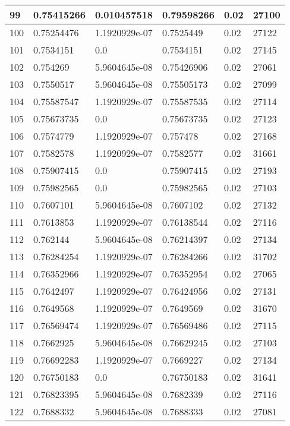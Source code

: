 \begin{longtable}{|l|l|l|l|l|l|}
99 & 0.75415266 & 0.010457518 & 0.79598266 & 0.02 & 27100 \\ \hline 
100 & 0.75254476 & 1.1920929e-07 & 0.7525449 & 0.02 & 27122 \\ \hline 
101 & 0.7534151 & 0.0 & 0.7534151 & 0.02 & 27145 \\ \hline 
102 & 0.754269 & 5.9604645e-08 & 0.75426906 & 0.02 & 27061 \\ \hline 
103 & 0.7550517 & 5.9604645e-08 & 0.75505173 & 0.02 & 27099 \\ \hline 
104 & 0.75587547 & 1.1920929e-07 & 0.75587535 & 0.02 & 27114 \\ \hline 
105 & 0.75673735 & 0.0 & 0.75673735 & 0.02 & 27123 \\ \hline 
106 & 0.7574779 & 1.1920929e-07 & 0.757478 & 0.02 & 27168 \\ \hline 
107 & 0.7582578 & 1.1920929e-07 & 0.7582577 & 0.02 & 31661 \\ \hline 
108 & 0.75907415 & 0.0 & 0.75907415 & 0.02 & 27193 \\ \hline 
109 & 0.75982565 & 0.0 & 0.75982565 & 0.02 & 27103 \\ \hline 
110 & 0.7607101 & 5.9604645e-08 & 0.7607102 & 0.02 & 27132 \\ \hline 
111 & 0.7613853 & 1.1920929e-07 & 0.76138544 & 0.02 & 27116 \\ \hline 
112 & 0.762144 & 5.9604645e-08 & 0.76214397 & 0.02 & 27134 \\ \hline 
113 & 0.76284254 & 1.1920929e-07 & 0.76284266 & 0.02 & 31702 \\ \hline 
114 & 0.76352966 & 1.1920929e-07 & 0.76352954 & 0.02 & 27065 \\ \hline 
115 & 0.7642497 & 1.1920929e-07 & 0.76424956 & 0.02 & 27131 \\ \hline 
116 & 0.7649568 & 1.1920929e-07 & 0.7649569 & 0.02 & 31670 \\ \hline 
117 & 0.76569474 & 1.1920929e-07 & 0.76569486 & 0.02 & 27115 \\ \hline 
118 & 0.7662925 & 5.9604645e-08 & 0.76629245 & 0.02 & 27103 \\ \hline 
119 & 0.76692283 & 1.1920929e-07 & 0.7669227 & 0.02 & 27134 \\ \hline 
120 & 0.76750183 & 0.0 & 0.76750183 & 0.02 & 31641 \\ \hline 
121 & 0.76823395 & 5.9604645e-08 & 0.7682339 & 0.02 & 27116 \\ \hline 
122 & 0.7688332 & 5.9604645e-08 & 0.7688333 & 0.02 & 27081 \\ \hline 

\end{longtable}
